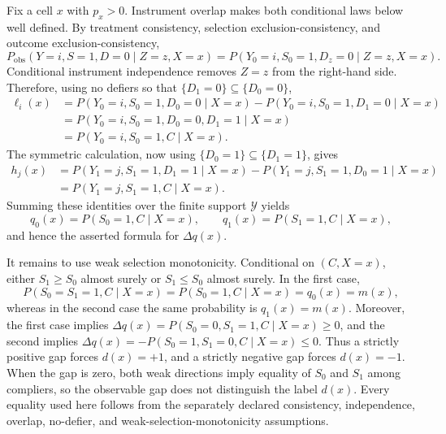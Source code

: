 Fix a cell \(x\) with \(p_x>0\).  Instrument overlap makes both conditional laws below well defined.  By treatment consistency, selection exclusion-consistency, and outcome exclusion-consistency,
\[
 P_{\mathrm{obs}}(Y=i,S=1,D=0\mid Z=z,X=x)
 =P(Y_0=i,S_0=1,D_z=0\mid Z=z,X=x).
\]
Conditional instrument independence removes \(Z=z\) from the right-hand side.  Therefore, using no defiers so that \(\{D_1=0\}\subseteq\{D_0=0\}\),
\[
\begin{aligned}
\ell_i(x)
&=P(Y_0=i,S_0=1,D_0=0\mid X=x)
  -P(Y_0=i,S_0=1,D_1=0\mid X=x)\\
&=P(Y_0=i,S_0=1,D_0=0,D_1=1\mid X=x)\\
&=P(Y_0=i,S_0=1,C\mid X=x).
\end{aligned}
\]
The symmetric calculation, now using \(\{D_0=1\}\subseteq\{D_1=1\}\), gives
\[
\begin{aligned}
h_j(x)
&=P(Y_1=j,S_1=1,D_1=1\mid X=x)
  -P(Y_1=j,S_1=1,D_0=1\mid X=x)\\
&=P(Y_1=j,S_1=1,C\mid X=x).
\end{aligned}
\]
Summing these identities over the finite support \(\mathcal Y\) yields
\[
q_0(x)=P(S_0=1,C\mid X=x),\qquad
q_1(x)=P(S_1=1,C\mid X=x),
\]
and hence the asserted formula for \(\Delta q(x)\).

It remains to use weak selection monotonicity.  Conditional on \((C,X=x)\), either \(S_1\ge S_0\) almost surely or \(S_1\le S_0\) almost surely.  In the first case,
\[
P(S_0=S_1=1,C\mid X=x)=P(S_0=1,C\mid X=x)=q_0(x)=m(x),
\]
whereas in the second case the same probability is \(q_1(x)=m(x)\).  Moreover, the first case implies \(\Delta q(x)=P(S_0=0,S_1=1,C\mid X=x)\ge0\), and the second implies \(\Delta q(x)=-P(S_0=1,S_1=0,C\mid X=x)\le0\).  Thus a strictly positive gap forces \(d(x)=+1\), and a strictly negative gap forces \(d(x)=-1\).  When the gap is zero, both weak directions imply equality of \(S_0\) and \(S_1\) among compliers, so the observable gap does not distinguish the label \(d(x)\).  Every equality used here follows from the separately declared consistency, independence, overlap, no-defier, and weak-selection-monotonicity assumptions.